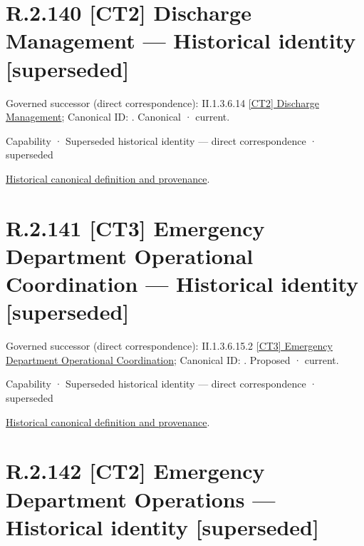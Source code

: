 \section*{R.2.140 [CT2] Discharge Management — Historical identity [superseded]}
\label{navigation:R.2.140}

{\small Governed successor (direct correspondence): II.1.3.6.14 \hyperref[element:ec5e8d6732764aa489c2dd7630fc8fef]{[CT2] Discharge Management}; Canonical ID: \texttt{}. Canonical · current.}\par
\label{element:c57c0721ab0040ccb24e88e5e92e8cf8}
{\small Capability · Superseded historical identity — direct correspondence · superseded}\par
\href{../../../../continuum/strategy/capability/c57c0721ab0040ccb24e88e5e92e8cf8.md}{Historical canonical definition and provenance}.\par
\section*{R.2.141 [CT3] Emergency Department Operational Coordination — Historical identity [superseded]}
\label{navigation:R.2.141}

{\small Governed successor (direct correspondence): II.1.3.6.15.2 \hyperref[element:8f0b0f3d9e8d44a7827b0835870b4a4f]{[CT3] Emergency Department Operational Coordination}; Canonical ID: \texttt{}. Proposed · current.}\par
\label{element:15b6d2518e60444098b7c546ca31c49b}
{\small Capability · Superseded historical identity — direct correspondence · superseded}\par
\href{../../../../continuum/strategy/capability/15b6d2518e60444098b7c546ca31c49b.md}{Historical canonical definition and provenance}.\par
\section*{R.2.142 [CT2] Emergency Department Operations — Historical identity [superseded]}
\label{navigation:R.2.142}

